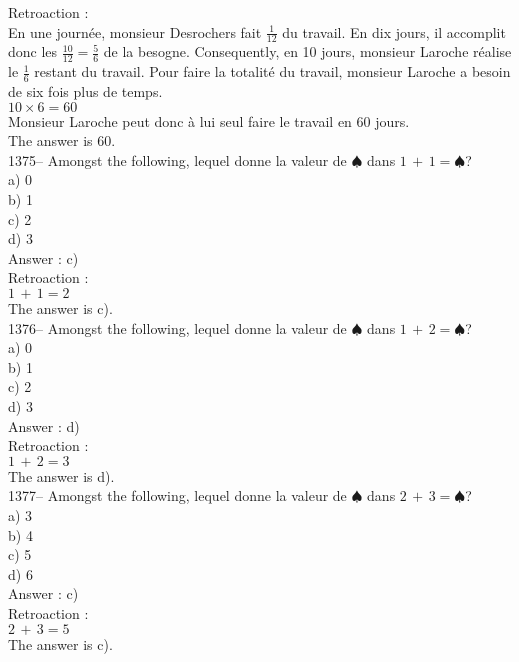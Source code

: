 ﻿\documentclass[letterpaper, 12pt]{article}
\begin{document}
Retroaction : \\
En une journ\'ee, monsieur Desrochers fait $\frac{1}{12}$ du travail.  En
dix jours, il accomplit donc les $\frac{10}{12}=\frac{5}{6}$ de la besogne.
Consequently, en 10 jours, monsieur Laroche r\'ealise le $\frac{1}{6}$
restant du travail.  Pour faire la totalit\'e du travail, monsieur Laroche a
besoin de six fois plus de temps.\\
$10\times6=60$\\
Monsieur Laroche peut donc \`a lui seul faire le travail en 60 jours.  \\
The answer is 60.\\



1375-- Amongst the following, lequel donne la valeur de
$\spadesuit$ dans $1\,+\,1=\spadesuit$?\\
a) 0\\
b) 1\\
c) 2\\
d) 3\\

Answer : c)\\

Retroaction : \\
$1\,+\,1=2$\\
The answer is c).\\

1376-- Amongst the following, lequel donne la valeur de
$\spadesuit$ dans $1\,+\,2=\spadesuit$?\\
a) 0\\
b) 1\\
c) 2\\
d) 3\\

Answer : d)\\

Retroaction : \\
$1\,+\,2=3$\\
The answer is d).\\

1377-- Amongst the following, lequel donne la valeur de
$\spadesuit$ dans $2\,+\,3=\spadesuit$?\\
a) 3\\
b) 4\\
c) 5\\
d) 6\\

Answer : c)\\

Retroaction : \\
$2\,+\,3=5$\\
The answer is c).\\
\end{document}
